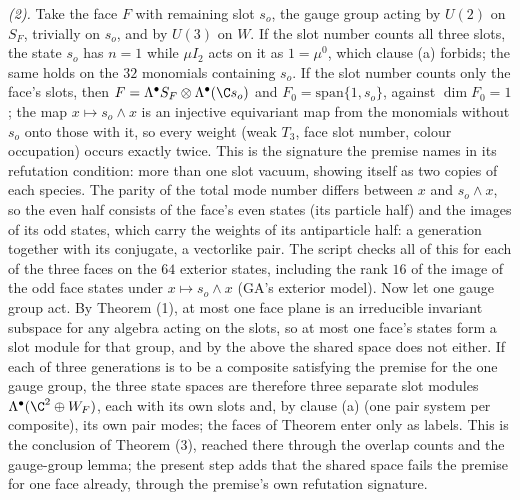 \emph{(2).} Take the face $F$ with remaining slot $s_{o}$, the gauge group acting by $U(2)$ on $S_{F}$, trivially on $s_{o}$, and by $U(3)$ on $W$. If the slot number counts all three slots, the state $s_{o}$ has $n = 1$ while $\mu I_{2}$ acts on it as $1 = \mu^{0}$, which clause (a) forbids; the same holds on the $32$ monomials containing $s_{o}$. If the slot number counts only the face's slots, then $F = \Lambda^{\bullet}S_{F} \otimes \Lambda^{\bullet}(\C s_{o})$ and $F_{0} = \mathrm{span}\{1, s_{o}\}$, against $\dim F_{0} = 1$; the map $x \mapsto s_{o} \wedge x$ is an injective equivariant map from the monomials without $s_{o}$ onto those with it, so every weight (weak $T_{3}$, face slot number, colour occupation) occurs exactly twice. This is the signature the premise names in its refutation condition: more than one slot vacuum, showing itself as two copies of each species. The parity of the total mode number differs between $x$ and $s_{o} \wedge x$, so the even half consists of the face's even states (its particle half) and the images of its odd states, which carry the weights of its antiparticle half: a generation together with its conjugate, a vectorlike pair. The script checks all of this for each of the three faces on the $64$ exterior states, including the rank $16$ of the image of the odd face states under $x \mapsto s_{o} \wedge x$ (GA's exterior model). Now let one gauge group act. By Theorem (1), at most one face plane is an irreducible invariant subspace for any algebra acting on the slots, so at most one face's states form a slot module for that group, and by the above the shared space does not either. If each of three generations is to be a composite satisfying the premise for the one gauge group, the three state spaces are therefore three separate slot modules $\Lambda^{\bullet}(\C^{2} \oplus W_{F})$, each with its own slots and, by clause (a) (one pair system per composite), its own pair modes; the faces of Theorem  enter only as labels. This is the conclusion of Theorem (3), reached there through the overlap counts and the gauge-group lemma; the present step adds that the shared space fails the premise for one face already, through the premise's own refutation signature.

